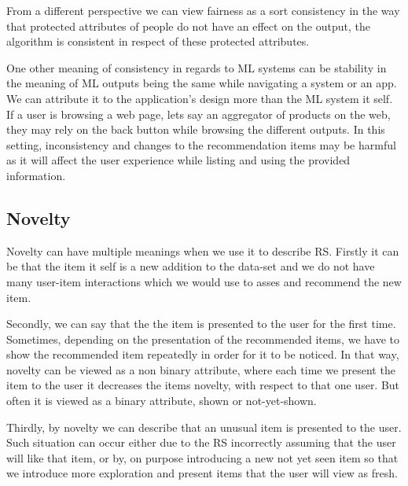 From a different perspective we can view fairness as a sort consistency in the way that protected attributes of people do not have an effect on the output, the algorithm is consistent in respect of these protected attributes.


One other meaning of consistency in regards to ML systems can be stability in the meaning of ML outputs being the same while navigating a system or an app. We can attribute it to the application's design more than the ML system it self. If a user is browsing a web page, lets say an aggregator of products on the web, they may rely on the back button while browsing the different outputs. In this setting, inconsistency and changes to the recommendation items may be harmful as it will affect the user experience while listing and using the provided information.

\subsection{Novelty}
Novelty can have multiple meanings when we use it to describe RS. Firstly it can be that the item it self is a new addition to the data-set and we do not have many user-item interactions which we would use to asses and recommend the new item.

Secondly, we can say that the the item is presented to the user for the first time. Sometimes, depending on the presentation of the recommended items, we have to show the recommended item repeatedly in order for it to be noticed. In that way, novelty can be viewed as a non binary attribute, where each time we present the item to the user it decreases the items novelty, with respect to that one user. But often it is viewed as a binary attribute, shown or not-yet-shown.

Thirdly, by novelty we can describe that an unusual item is presented to the user. Such situation can occur either due to the RS incorrectly assuming that the user will like that item, or by, on purpose introducing a new not yet seen item so that we introduce more exploration and present items that the user will view as fresh.

